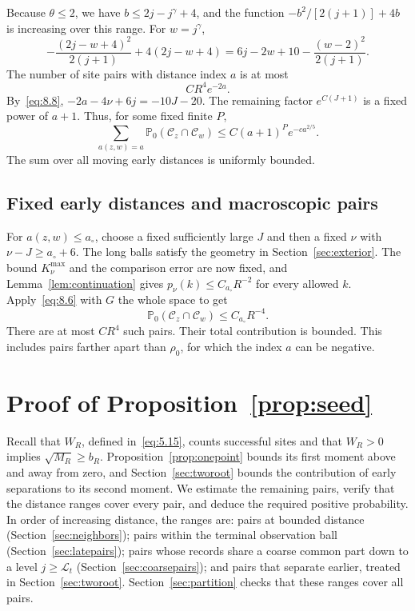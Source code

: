 \documentclass[11pt,letterpaper,reqno]{amsart}
\newif\ifrevmarks \revmarkstrue
\newcommand{\add}[1]{\ifrevmarks\textcolor{revorange}{#1}\else#1\fi}
\numberwithin{equation}{section}
\theoremstyle{remark}
\begin{document}
Because $\theta\le2$, we have $b\le2j-j^\gamma+4$, and the function
$-b^2/[2(j+1)]+4b$ is increasing over this range. For $w=j^\gamma$,
\begin{equation}\label{eq:8.25}
-\frac{(2j-w+4)^2}{2(j+1)}+4(2j-w+4)
=6j-2w+10-\frac{(w-2)^2}{2(j+1)}.
\end{equation}
The number of site pairs with distance index $a$ is at most
\begin{equation}\label{eq:8.26}
CR^4e^{-2a}.
\end{equation}
By~\eqref{eq:8.8}, $-2a-4\nu+6j=-10J-20$. The remaining factor $e^{C(J+1)}$ is a fixed power of $a+1$. Thus, for some fixed finite $P$,
\begin{equation}\label{eq:8.27}
\sum_{a(z,w)=a}\mathbb P_0(\mathcal C_z\cap\mathcal C_w)
\le C(a+1)^P e^{-c a^{2/5}}.
\end{equation}
The sum over all moving early distances is uniformly bounded.

\subsection{Fixed early distances and macroscopic pairs}\label{sec:far}
For $a(z,w)\le a_\circ$, choose a fixed sufficiently large $J$ and then a fixed $\nu$ with $\nu-J\ge a_\circ+6$. The long balls satisfy the geometry in Section~\ref{sec:exterior}. The bound $K_\nu^{\max}$ and the comparison error are now fixed, and Lemma~\ref{lem:continuation} gives
$p_\nu(k)\le C_{a_\circ}R^{-2}$ for every allowed $k$. Apply~\eqref{eq:8.6} with $G$ the whole space to get
\begin{equation}\label{eq:8.28}
\mathbb P_0(\mathcal C_z\cap\mathcal C_w)
\le C_{a_\circ}R^{-4}.
\end{equation}
There are at most $CR^4$ such pairs. Their total contribution is bounded. This includes pairs farther apart than $\rho_0$, for which the index $a$ can be negative.


\section{Proof of Proposition~\ref{prop:seed}}\label{sec:second}
Recall that $W_R$, defined in~\eqref{eq:5.15}, counts successful sites and that $W_R>0$ implies $\sqrt{M_R}\ge b_R$. Proposition~\ref{prop:onepoint} bounds its first moment above and away from zero, and Section~\ref{sec:tworoot} bounds the contribution of early separations to its second moment. We estimate the remaining pairs, verify that the distance ranges cover every pair, and deduce the required positive probability. \add{In order of increasing distance, the ranges are: pairs at bounded distance (Section~\ref{sec:neighbors}); pairs within the terminal observation ball (Section~\ref{sec:latepairs}); pairs whose records share a coarse common part down to a level $j\ge\mathcal L_t$ (Section~\ref{sec:coarsepairs}); and pairs that separate earlier, treated in Section~\ref{sec:tworoot}. Section~\ref{sec:partition} checks that these ranges cover all pairs.}
\end{document}
